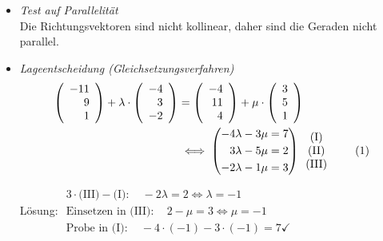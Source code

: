 \documentclass{ajc}
\numberwithin{equation}{subsection}
\newcommand\numberthis{\addtocounter{equation}{1}\tag{\theequation}}
\begin{document}
	\begin{itemize}
		\item \textit{Test auf Parallelität} \\ 
		Die Richtungsvektoren sind nicht kollinear, daher sind die Geraden nicht parallel.
		
		\item \textit{Lageentscheidung (Gleichsetzungsverfahren)} \\
		\begin{alignat*}{2}
			\left(\begin{array}{r} -11 \\ 9 \\ 1\end{array}\right) + \lambda \cdot \left(\begin{array}{r} -4 \\ 3 \\ -2\end{array}\right) &= \left(\begin{array}{r} -4 \\ 11 \\ 4\end{array}\right) + \mu \cdot \left(\begin{array}{r} 3 \\ 5 \\ 1\end{array}\right) \\
			&\iff \left(\begin{aligned} -4 \lambda - 3 \mu &= 7 \\ 3 \lambda - 5 \mu &= 2 \\ -2 \lambda  - 1 \mu &= 3 \end{aligned}\right) \begin{array}{c} \text{(I)} \\ \text{(II)} \\ \text{(III)}\end{array} \numberthis
		\end{alignat*}
		
		Lösung: $\begin{array}{l}
			3\cdot\text{(III)} - \text{(I)}: \quad -2\lambda = 2 \Leftrightarrow \lambda = -1 \\ \text{Einsetzen in (III)}: \quad 2 - \mu = 3 \Leftrightarrow \mu = -1 \\ \text{Probe in  (I)}: \quad -4\cdot(-1) -3\cdot(-1) = 7 \checkmark \end{array}$
			

\end{itemize}
\end{document}
